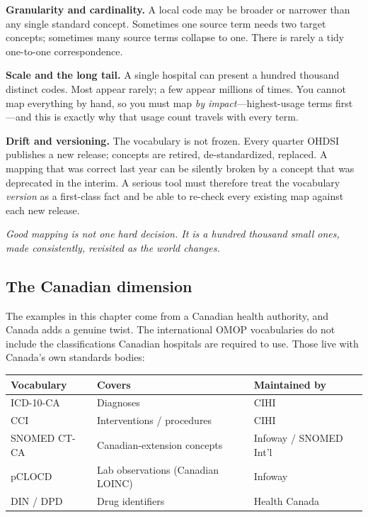 \documentclass[12pt,openany]{book}
\newcommand{\pullquote}[1]{%
  \begin{center}\smallskip
  {\sffamily\itshape\large\color{cometbrown} #1}\smallskip\end{center}}
\begin{document}
\textbf{Granularity and cardinality.} A local code may be broader or narrower than any single standard
concept. Sometimes one source term needs two target concepts; sometimes many source terms collapse to
one. There is rarely a tidy one-to-one correspondence.

\textbf{Scale and the long tail.} A single hospital can present a hundred thousand distinct codes. Most
appear rarely; a few appear millions of times. You cannot map everything by hand, so you must map
\emph{by impact}---highest-usage terms first---and this is exactly why that usage count travels with
every term.

\textbf{Drift and versioning.} The vocabulary is not frozen. Every quarter OHDSI publishes a new
release; concepts are retired, de-standardized, replaced. A mapping that was correct last year can be
silently broken by a concept that was deprecated in the interim. A serious tool must therefore treat
the vocabulary \emph{version} as a first-class fact and be able to re-check every existing map against
each new release.

\pullquote{Good mapping is not one hard decision. It is a hundred thousand small ones, made
consistently, revisited as the world changes.}

\subsection{The Canadian dimension}

The examples in this chapter come from a Canadian health authority, and Canada adds a genuine twist.
The international OMOP vocabularies do not include the classifications Canadian hospitals are required
to use. Those live with Canada's own standards bodies:

\begin{center}
\small\sffamily
\begin{tabular}{@{}lll@{}}
\toprule
\textbf{Vocabulary} & \textbf{Covers} & \textbf{Maintained by} \\
\midrule
ICD-10-CA & Diagnoses & CIHI \\
CCI & Interventions / procedures & CIHI \\
SNOMED CT-CA & Canadian-extension concepts & Infoway / SNOMED Int'l \\
pCLOCD & Lab observations (Canadian LOINC) & Infoway \\
DIN / DPD & Drug identifiers & Health Canada \\
\bottomrule
\end{tabular}
\end{center}
\end{document}
